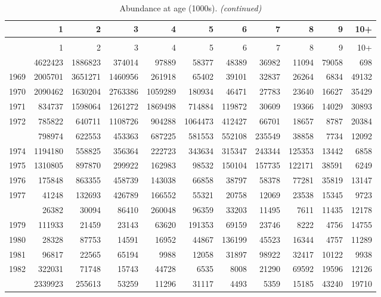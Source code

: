 \documentclass[
]{article}
\begin{document}
\begin{longtable}[t]{lrrrrrrrrrr}
\caption{\label{tab:NAA-table}Abundance at age (1000s).}\\
\toprule
  & 1 & 2 & 3 & 4 & 5 & 6 & 7 & 8 & 9 & 10+\\
\midrule
\endfirsthead
\caption[]{Abundance at age (1000s). \textit{(continued)}}\\
\toprule
  & 1 & 2 & 3 & 4 & 5 & 6 & 7 & 8 & 9 & 10+\\
\midrule
\endhead

\endfoot
\bottomrule
\endlastfoot
1968 & 4622423 & 1886823 & 374014 & 97889 & 58377 & 48389 & 36982 & 11094 & 79058 & 698\\
1969 & 2005701 & 3651271 & 1460956 & 261918 & 65402 & 39101 & 32837 & 26264 & 6834 & 49132\\
1970 & 2090462 & 1630204 & 2763386 & 1059289 & 180934 & 46471 & 27783 & 23640 & 16627 & 35429\\
1971 & 834737 & 1598064 & 1261272 & 1869498 & 714884 & 119872 & 30609 & 19366 & 14029 & 30893\\
1972 & 785822 & 640711 & 1108726 & 904288 & 1064473 & 412427 & 66701 & 18657 & 8787 & 20384\\
\addlinespace
1973 & 798974 & 622553 & 453363 & 687225 & 581553 & 552108 & 235549 & 38858 & 7734 & 12092\\
1974 & 1194180 & 558825 & 356364 & 222723 & 343634 & 315347 & 243344 & 125353 & 13442 & 6858\\
1975 & 1310805 & 897870 & 299922 & 162983 & 98532 & 150104 & 157735 & 122171 & 38591 & 6249\\
1976 & 175848 & 863355 & 458739 & 143038 & 66858 & 38797 & 58378 & 77281 & 35819 & 13147\\
1977 & 41248 & 132693 & 426789 & 166552 & 55321 & 20758 & 12069 & 23538 & 15345 & 9723\\
\addlinespace
1978 & 26382 & 30094 & 86410 & 260048 & 96359 & 33203 & 11495 & 7611 & 11435 & 12178\\
1979 & 111933 & 21459 & 23143 & 63620 & 191353 & 69159 & 23746 & 8222 & 4756 & 14755\\
1980 & 28328 & 87753 & 14591 & 16952 & 44867 & 136199 & 45523 & 16344 & 4757 & 11289\\
1981 & 96817 & 22565 & 65194 & 9988 & 12058 & 31897 & 98922 & 32417 & 10122 & 9938\\
1982 & 322031 & 71748 & 15743 & 44728 & 6535 & 8008 & 21290 & 69592 & 19596 & 12126\\
\addlinespace
1983 & 2339923 & 255613 & 53259 & 11296 & 31117 & 4493 & 5359 & 15185 & 43240 & 19710\\

\end{longtable}
\end{document}
